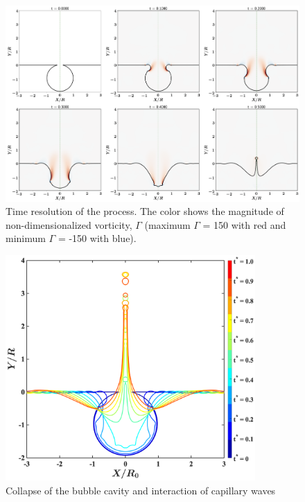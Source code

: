\documentclass[a4paper,10pt]{article}
\begin{document}
\begin{figure}[H]
\begin{center}
 \includegraphics[width=\textwidth]{temporal.png}
 \caption{Time resolution of the process. The color shows the magnitude of non-dimensionalized vorticity, $\Gamma$ (maximum $\Gamma$ = 150 with red and minimum $\Gamma$ = -150 with blue).}
 \label{Figure::Typical}
\end{center}
\end{figure}
\begin{figure}[H]
\begin{center}
 \includegraphics[width=0.85\textwidth]{interface.eps}
 \caption{Collapse of the bubble cavity and interaction of capillary waves}
 \label{Figure::Waves}
\end{center}
\end{figure}
\end{document}
